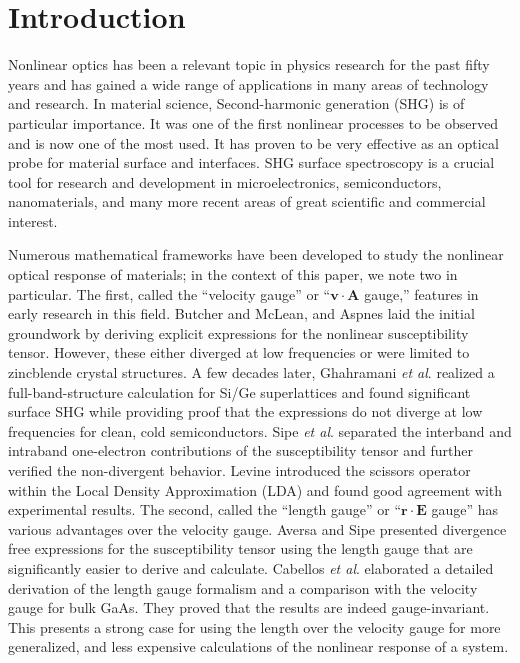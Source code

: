 \section{Introduction}\label{intro}

Nonlinear optics has been a relevant topic in physics research for the past 
fifty years and has gained a wide range of applications in 
many areas of technology and research. In material science,
Second-harmonic generation (SHG) is of particular importance.
It was one of the first nonlinear processes to be observed and is now one
of the most used. It has proven to be very effective as an 
optical probe for material surface and interfaces. 
\cite{hughesPRB96, 
     guyot-sionnestPRB88, 
     lupkeSSR99, 
     downerPSSA01, 
     shenAPB99, 
     shenNAT89, 
     chenPRL81, 
     maytorenaPRB98}
SHG surface spectroscopy is a crucial tool for research and development
in microelectronics, semiconductors, nanomaterials, and many more recent 
areas of great scientific and commercial interest.

Numerous mathematical frameworks have been developed to study the 
nonlinear optical response of materials; 
in the context of this paper, we note two in particular. 
The first, called the ``velocity gauge'' or 
``$\mathbf{v}\cdot\mathbf{A}$ gauge,'' features in early 
research in this field. 
Butcher and McLean\cite{butcherPOPS63}, and 
Aspnes\cite{aspnesPRB72} 
laid the initial groundwork by deriving explicit expressions for the 
nonlinear susceptibility tensor. However, these either diverged at 
low frequencies or were limited to zincblende crystal structures. 
A few decades later, 
Ghahramani \emph{et al}.\cite{ghahramaniPRB91} 
realized a full-band-structure calculation for Si/Ge superlattices and 
found significant surface SHG while providing proof that the expressions 
do not diverge at low frequencies for clean, cold semiconductors. 
Sipe \emph{et al}.\cite{sipePRB93}
separated the interband and intraband one-electron contributions 
of the susceptibility tensor and further verified the non-divergent behavior. 
Levine\cite{levinePRB94} 
introduced the scissors operator within the Local Density Approximation
(LDA) and found good agreement with experimental results. 
The second, called the ``length gauge'' or 
``$\mathbf{r}\cdot\mathbf{E}$ gauge'' has various advantages over 
the velocity gauge. 
Aversa and Sipe\cite{aversaPRB95} 
presented divergence free expressions for the susceptibility tensor using 
the length gauge that are significantly easier to derive and calculate. 
Cabellos \emph{et al}.\cite{cabellosPRB09} 
elaborated a detailed derivation of the length gauge 
formalism and a comparison with the velocity gauge for bulk GaAs. They 
proved that the results are indeed gauge-invariant. 
This presents a strong case for using the length over the velocity gauge 
for more generalized, and less expensive calculations of the nonlinear
response of a system.

